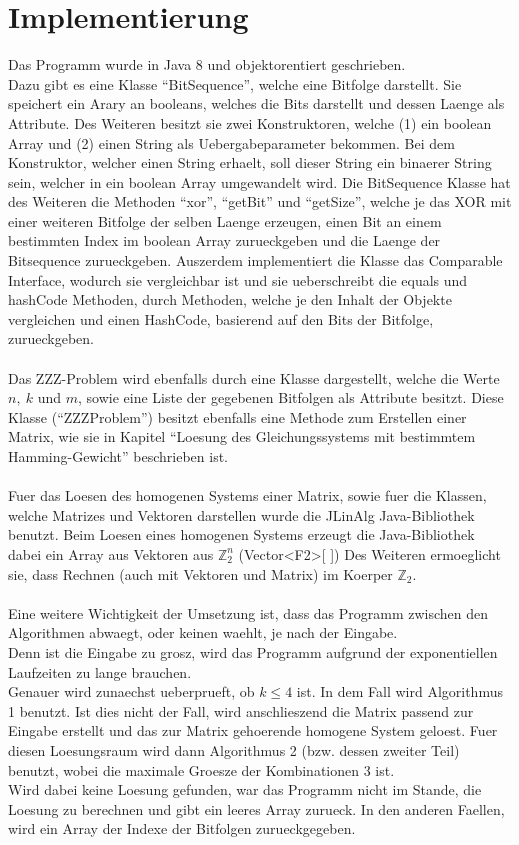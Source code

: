 \documentclass[a4paper,10pt,ngerman]{scrartcl}
\begin{document}
{\section{Implementierung}
Das Programm wurde in Java 8 und objektorentiert geschrieben.
\\ Dazu gibt es eine Klasse "`BitSequence"', welche eine Bitfolge darstellt. Sie speichert ein Arary an booleans, welches die Bits darstellt und dessen Laenge als Attribute. 
Des Weiteren besitzt sie zwei Konstruktoren, welche (1) ein boolean Array und (2) einen String als Uebergabeparameter bekommen. Bei dem Konstruktor, welcher einen String erhaelt, soll dieser String ein binaerer String sein, welcher in ein boolean Array umgewandelt wird.
Die BitSequence Klasse hat des Weiteren die Methoden "`xor"', "`getBit"' und "`getSize"', welche je das XOR mit einer weiteren Bitfolge der selben Laenge erzeugen, einen Bit an einem bestimmten Index im boolean Array zurueckgeben und die Laenge der Bitsequence zurueckgeben. Auszerdem implementiert die Klasse das Comparable Interface, wodurch sie vergleichbar ist und sie ueberschreibt die equals und hashCode Methoden, durch Methoden, welche je den Inhalt der Objekte vergleichen und einen HashCode, basierend auf den Bits der Bitfolge, zurueckgeben.
\\\\
Das ZZZ-Problem wird ebenfalls durch eine Klasse dargestellt, welche die Werte $n, \ k$ und $m$, sowie eine Liste der gegebenen Bitfolgen als Attribute besitzt. Diese Klasse ("`ZZZProblem"') besitzt ebenfalls eine Methode zum Erstellen einer Matrix, wie sie in Kapitel "`Loesung des Gleichungssystems mit bestimmtem Hamming-Gewicht"' beschrieben ist.
\\\\
Fuer das Loesen des homogenen Systems einer Matrix, sowie fuer die Klassen, welche Matrizes und Vektoren darstellen wurde die JLinAlg Java-Bibliothek benutzt. 
Beim Loesen eines homogenen Systems erzeugt die Java-Bibliothek dabei ein Array aus Vektoren aus \(\mathbb{Z}_{2}^n\) (Vector<F2>[ ])
Des Weiteren ermoeglicht sie, dass Rechnen (auch mit Vektoren und Matrix) im Koerper \(\mathbb{Z}_{2}\). 
\\\\
Eine weitere Wichtigkeit der Umsetzung ist, dass das Programm zwischen den Algorithmen abwaegt, oder keinen waehlt, je nach der Eingabe.\\
Denn ist die Eingabe zu grosz, wird das Programm aufgrund der exponentiellen Laufzeiten zu lange brauchen. \\
Genauer wird zunaechst ueberprueft, ob $k \leq 4$ ist. In dem Fall wird Algorithmus 1 benutzt. Ist dies nicht der Fall, wird anschlieszend die Matrix passend zur Eingabe erstellt und das zur Matrix gehoerende homogene System geloest. Fuer diesen Loesungsraum wird dann Algorithmus 2 (bzw. dessen zweiter Teil) benutzt, wobei die maximale Groesze der Kombinationen 3 ist.\\
Wird dabei keine Loesung gefunden, war das Programm nicht im Stande, die Loesung zu berechnen und gibt ein leeres Array zurueck. In den anderen Faellen, wird ein Array der Indexe der Bitfolgen zurueckgegeben.

}
\end{document}
